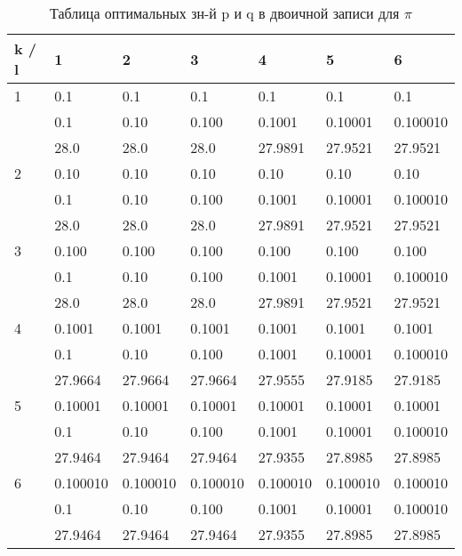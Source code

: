 \documentclass[12pt]{article}
\begin{document}
\begin{table}[h]
	\caption{Таблица оптимальных зн-й p и q в двоичной записи для $\pi$}
	\label{table:piBinary}
	\begin{center}
		\begin{tabular}{|l|l|l|l|l|l|l|}
			\hline
			k / l &1 & 2 & 3 & 4 & 5 & 6\\
			\hline
			1 & 0.1& 0.1& 0.1& 0.1& 0.1& 0.1\\
			& 0.1& 0.10& 0.100& 0.1001& 0.10001& 0.100010\\
			& 28.0& 28.0& 28.0& 27.9891& 27.9521& 27.9521\\
			\hline
			2 & 0.10& 0.10& 0.10& 0.10& 0.10& 0.10\\
			& 0.1& 0.10& 0.100& 0.1001& 0.10001& 0.100010\\
			& 28.0& 28.0& 28.0& 27.9891& 27.9521& 27.9521\\
			\hline
			3 & 0.100& 0.100& 0.100& 0.100& 0.100& 0.100\\
			& 0.1& 0.10& 0.100& 0.1001& 0.10001& 0.100010\\
			& 28.0& 28.0& 28.0& 27.9891& 27.9521& 27.9521\\
			\hline
			4 & 0.1001& 0.1001& 0.1001& 0.1001& 0.1001& 0.1001\\
			& 0.1& 0.10& 0.100& 0.1001& 0.10001& 0.100010\\
			& 27.9664& 27.9664& 27.9664& 27.9555& 27.9185& 27.9185\\
			\hline
			5 & 0.10001& 0.10001& 0.10001& 0.10001& 0.10001& 0.10001\\
			& 0.1& 0.10& 0.100& 0.1001& 0.10001& 0.100010\\
			& 27.9464& 27.9464& 27.9464& 27.9355& 27.8985& 27.8985\\
			\hline
			6 & 0.100010& 0.100010& 0.100010& 0.100010& 0.100010& 0.100010\\
			& 0.1& 0.10& 0.100& 0.1001& 0.10001& 0.100010\\
			& 27.9464& 27.9464& 27.9464& 27.9355& 27.8985& 27.8985\\
			\hline
		\end{tabular}
	\end{center}
\end{table}
	
\end{document}
